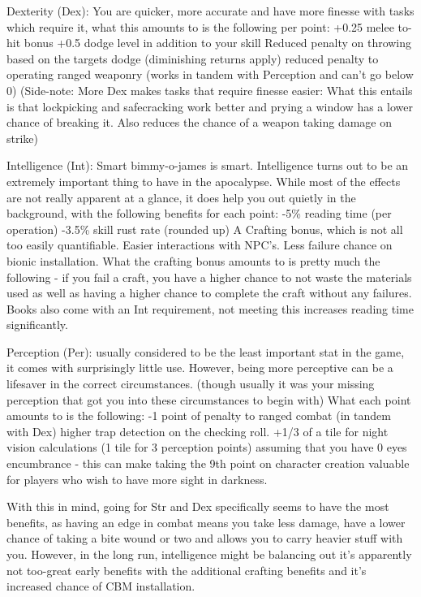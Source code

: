 \documentclass[11pt]{report}
\begin{document}
Dexterity (Dex): You are quicker, more accurate and have more finesse with tasks which require it, what this amounts to is the following per point:
+0.25 melee to-hit bonus
+0.5 dodge level in addition to your skill
Reduced penalty on throwing based on the targets dodge (diminishing returns apply)
reduced penalty to operating ranged weaponry (works in tandem with Perception and can't go below 0)
(Side-note: More Dex makes tasks that require finesse easier: What this entails is that lockpicking and safecracking work better and prying a window has a lower chance of breaking it. Also reduces the chance of a weapon taking damage on strike)

Intelligence (Int): Smart bimmy-o-james is smart. Intelligence turns out to be an extremely important thing to have in the apocalypse. While most of the effects are not really apparent at a glance, it does help you out quietly in the background, with the following benefits for each point:
-5\% reading time (per operation)
-3.5\% skill rust rate (rounded up)
A Crafting bonus, which is not all too easily quantifiable.
Easier interactions with NPC's.
Less failure chance on bionic installation.
What the crafting bonus amounts to is pretty much the following - if you fail a craft, you have a higher chance to not waste the materials used as well as having a higher chance to complete the craft without any failures.
Books also come with an Int requirement, not meeting this increases reading time significantly.

Perception (Per): usually considered to be the least important stat in the game, it comes with surprisingly little use. However, being more perceptive can be a lifesaver in the correct circumstances. (though usually it was your missing perception that got you into these circumstances to begin with)
What each point amounts to is the following:
-1 point of penalty to ranged combat (in tandem with Dex)
higher trap detection on the checking roll.
+1/3 of a tile for night vision calculations (1 tile for 3 perception points) assuming that you have 0 eyes encumbrance - this can make taking the 9th point on character creation valuable for players who wish to have more sight in darkness.

With this in mind, going for Str and Dex specifically seems to have the most benefits, as having an edge in combat means you take less damage, have a lower chance of taking a bite wound or two and allows you to carry heavier stuff with you.
However, in the long run, intelligence might be balancing out it's apparently not too-great early benefits with the additional crafting benefits and it's increased chance of CBM installation.
\end{document}
